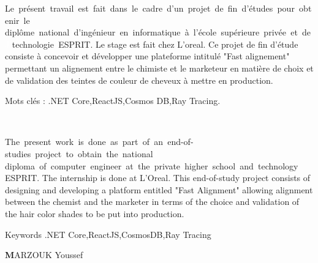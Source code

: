 \thispagestyle{empty}
\thispagestyle{empty}
\begin{center}
\end{center}
\vspace{0.8cm}

Le\textcolor{white}{J}présent\textcolor{white}{J}travail\textcolor{white}{J}est\textcolor{white}{J}fait\textcolor{white}{J}dans\textcolor{white}{J}le\textcolor{white}{J}cadre\textcolor{white}{J}d’un\textcolor{white}{J}projet\textcolor{white}{J}de\textcolor{white}{J}fin\textcolor{white}{J}d’études\textcolor{white}{J}pour\textcolor{white}{J}obtenir\textcolor{white}{J}le\textcolor{white}{J}
diplôme\textcolor{white}{J}national\textcolor{white}{J}d’ingénieur\textcolor{white}{J}en\textcolor{white}{J}informatique\textcolor{white}{J}à\textcolor{white}{J}l’école\textcolor{white}{J}supérieure\textcolor{white}{J}privée\textcolor{white}{J}et\textcolor{white}{J}de\textcolor{white}{J}
technologie\textcolor{white}{J}ESPRIT. Le stage est fait chez L'oreal. Ce projet de fin d’étude consiste à concevoir et développer une plateforme intitulé "Fast alignement" permettant un alignement entre le chimiste et le marketeur en matière de choix et de validation des teintes de couleur de cheveux à mettre en production.

Mots clés : .NET Core,ReactJS,Cosmos DB,Ray Tracing.

\\
\vspace{2cm}
\begin{center}
\end{center}
\vspace{0.8cm}
The\textcolor{white}{J}present\textcolor{white}{J}work\textcolor{white}{J}is\textcolor{white}{J}done\textcolor{white}{J}as\textcolor{white}{J}part\textcolor{white}{J}of\textcolor{white}{J}an\textcolor{white}{J}end-of-studies\textcolor{white}{J}project\textcolor{white}{J}to\textcolor{white}{J}obtain\textcolor{white}{J}the\textcolor{white}{J}national\textcolor{white}{J}
diploma\textcolor{white}{J}of\textcolor{white}{J}computer\textcolor{white}{J}engineer\textcolor{white}{J}at\textcolor{white}{J}the\textcolor{white}{J}private\textcolor{white}{J}higher\textcolor{white}{J}school\textcolor{white}{J}and\textcolor{white}{J}technology 
ESPRIT.
The internship is done at L'Oreal. This end-of-study project consists of designing and developing a platform entitled "Fast Alignment" allowing alignment between the chemist and the marketer in terms of the choice and validation of the hair color shades to be put into production.

Keywords .NET Core,ReactJS,CosmosDB,Ray Tracing

\begin{flushright}
\textbf MARZOUK Youssef
\end{flushright}